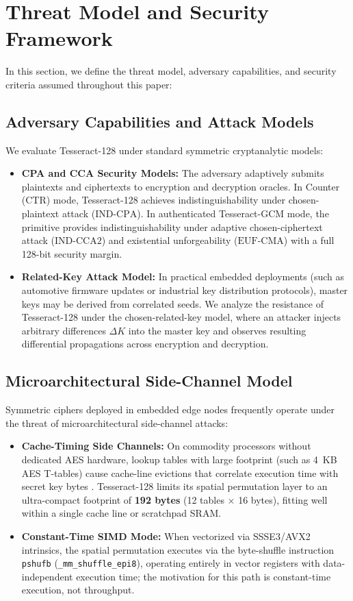\documentclass[review,12pt]{elsarticle}
\begin{document}
\section{Threat Model and Security Framework}
\label{sec:threat_model}

In this section, we define the threat model, adversary capabilities, and security criteria assumed throughout this paper:

\subsection{Adversary Capabilities and Attack Models}
We evaluate Tesseract-128 under standard symmetric cryptanalytic models:
\begin{itemize}
    \item \textbf{CPA and CCA Security Models:} The adversary adaptively submits plaintexts and ciphertexts to encryption and decryption oracles. In Counter (CTR) mode, Tesseract-128 achieves indistinguishability under chosen-plaintext attack ($\text{IND-CPA}$). In authenticated Tesseract-GCM mode, the primitive provides indistinguishability under adaptive chosen-ciphertext attack ($\text{IND-CCA2}$) and existential unforgeability ($\text{EUF-CMA}$) with a full 128-bit security margin.
    \item \textbf{Related-Key Attack Model:} In practical embedded deployments (such as automotive firmware updates or industrial key distribution protocols), master keys may be derived from correlated seeds. We analyze the resistance of Tesseract-128 under the chosen-related-key model, where an attacker injects arbitrary differences $\Delta K$ into the master key and observes resulting differential propagations across encryption and decryption.
\end{itemize}

\subsection{Microarchitectural Side-Channel Model}
Symmetric ciphers deployed in embedded edge nodes frequently operate under the threat of microarchitectural side-channel attacks:
\begin{itemize}
    \item \textbf{Cache-Timing Side Channels:} On commodity processors without dedicated AES hardware, lookup tables with large footprint (such as 4~KB AES T-tables) cause cache-line evictions that correlate execution time with secret key bytes \cite{gueron2010intel}. Tesseract-128 limits its spatial permutation layer to an ultra-compact footprint of \textbf{192 bytes} (12 tables $\times$ 16 bytes), fitting well within a single cache line or scratchpad SRAM.
    \item \textbf{Constant-Time SIMD Mode:} When vectorized via SSSE3/AVX2 intrinsics, the spatial permutation executes via the byte-shuffle instruction \texttt{pshufb} (\texttt{\_mm\_}\allowbreak\texttt{shuffle\_epi8}), operating entirely in vector registers with data-independent execution time; the motivation for this path is constant-time execution, not throughput.
\end{itemize}
\end{document}
